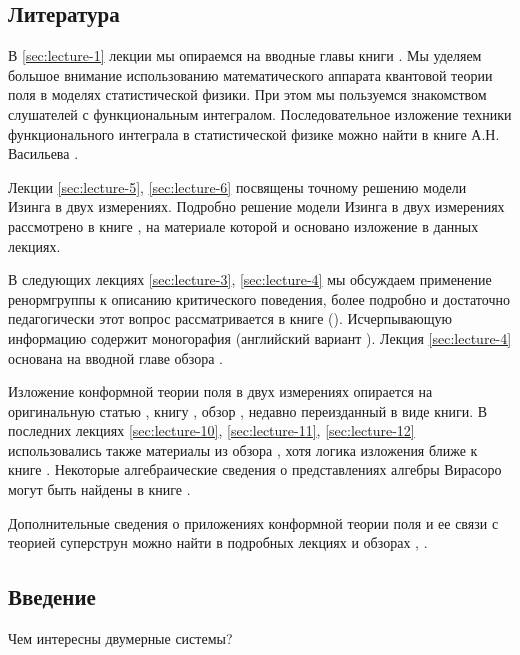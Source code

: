\documentclass[a4paper,12pt]{article}
\theoremstyle{definition}
\theoremstyle{definition}
\theoremstyle{definition}
\begin{document}
\subsection{Литература}
\label{sec:literature}
В \ref{sec:lecture-1} лекции  мы опираемся на вводные главы книги \cite{difrancesco1997cft}. Мы уделяем большое внимание использованию математического аппарата квантовой теории поля в моделях статистической физики. При этом мы пользуемся знакомством слушателей с функциональным интегралом. Последовательное изложение техники функционального интеграла в статистической физике можно найти в книге А.Н. Васильева \cite{vasiliev1976}.

Лекции \ref{sec:lecture-5}, \ref{sec:lecture-6} посвящены  точному решению модели Изинга в двух измерениях. Подробно решение  модели Изинга в двух измерениях рассмотрено в книге  \cite{belavin2001lect}, на материале которой и основано изложение в данных лекциях.

В следующих лекциях \ref{sec:lecture-3}, \ref{sec:lecture-4} мы обсуждаем применение ренормгруппы к описанию критического поведения, более подробно и достаточно педагогически этот вопрос рассматривается в книге \cite{ma1980} (\cite{ma2000modern}). Исчерпывающую информацию содержит моногорафия \cite{vasiliev1998} (английский вариант \cite{Vasilev:1027193}).
Лекция \ref{sec:lecture-4} основана на вводной главе обзора \cite{Ravanini:2000st}.

Изложение конформной теории поля в двух измерениях опирается на оригинальную статью \cite{belavin1984ics}, книгу \cite{difrancesco1997cft}, обзор \cite{zamolodchikov1989rus,zamolodchikov1989conformal}, недавно переизданный в виде книги. В последних лекциях \ref{sec:lecture-10}, \ref{sec:lecture-11}, \ref{sec:lecture-12} использовались также материалы из обзора \cite{Ginsparg:1988ui}, хотя логика изложения ближе к книге \cite{difrancesco1997cft}. Некоторые алгебраические сведения о представлениях алгебры Вирасоро  могут быть найдены в книге \cite{golod2001}.

Дополнительные сведения о приложениях конформной теории поля и ее связи с теорией суперструн можно найти в подробных лекциях \cite{springerlink:10.1134/S1063778810050108} и обзорах \cite{Walton:1999xc}, \cite{gaberdiel2000icf}.

\subsection{Введение}
\label{sec:intro}
Чем интересны двумерные системы?
\end{document}
